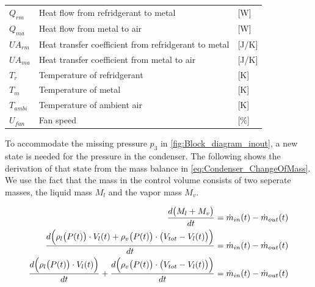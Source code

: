 \begin{center}
	\begin{tabular}{l p{8cm} l}
		$Q_{rm}$				&	Heat flow from refridgerant to metal					& [\si{W}] \\
		$Q_{ma}$				&	Heat flow from metal to air								& [\si{W}] \\
		$U A_{rm}$				& 	Heat transfer coefficient from refridgerant to metal 	& [\si{J}/\si{K}] \\
		$U A_{ma}$				& 	Heat transfer coefficient from metal to air				& [\si{J}/\si{K}] \\
		$T_r$					& 	Temperature of refridgerant 							& [\si{K}] \\
		$T_m$					&	Temperature of metal 									& [\si{K}] \\
		$T_{ambi}$				&	Temperature of ambient air 								& [\si{K}] \\
		$U_{fan}$				&	Fan speed												& [$\%$] \\
	\end{tabular}
\end{center}


To accommodate the missing pressure $ p_3 $ in \cref{fig:Block_diagram_inout}, a new state is needed for the pressure in the condenser. The following shows the derivation of that state from the mass balance in \cref{eq:Condenser_ChangeOfMass}. We use the fact that the mass in the control volume consists of two seperate masses, the liquid mass $ M_l $ and the vapor mass $ M_v $.


\begin{align}
		 		\frac{d \bigl(M_{l} + M_{v}\bigr) }{dt} & = \dot{m}_{in}(t) - \dot{m}_{out}(t) 		\label{eq:Condenser_pres1}\\
		 		\frac{d \Bigl(\rho_{l}\bigl(P(t)\bigr)\cdot V_l(t) + \rho_{v}\bigl(P(t)\bigr)\cdot \bigl(V_{tot} - V_l(t)\bigr)\Bigr) }{dt} & = \dot{m}_{in}(t) - \dot{m}_{out}(t)		\label{eq:Condenser_pres2}\\
		 		\frac{d \Bigl(\rho_{l}\bigl(P(t)\bigr)\cdot V_l(t)\Bigr)}{dt} + \frac{d \Bigl(\rho_{v}\bigl(P(t)\bigr)\cdot \bigl(V_{tot} - V_l(t)\bigr)\Bigr) }{dt} & = \dot{m}_{in}(t) - \dot{m}_{out}(t)		\label{eq:Condenser_pres3}
\end{align}

